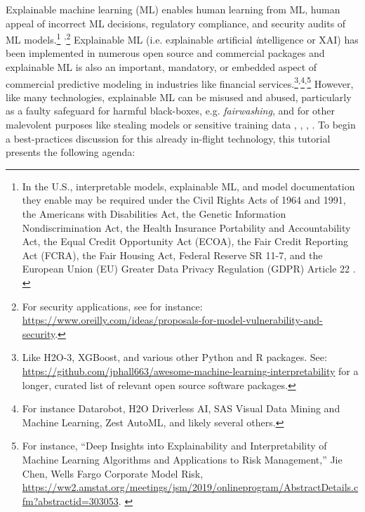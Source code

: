 \documentclass[sigconf]{acmart}
\begin{document}
Explainable machine learning (ML) enables human learning from ML, human appeal of incorrect ML decisions, regulatory compliance, and security audits of ML models.\footnote{In the U.S., interpretable models, explainable ML, and model documentation they enable may be required under the Civil Rights Acts of 1964 and 1991, the Americans with Disabilities Act, the Genetic Information Nondiscrimination Act, the Health Insurance Portability and Accountability Act, the Equal Credit Opportunity Act (ECOA), the Fair Credit Reporting Act (FCRA), the Fair Housing Act, Federal Reserve SR 11-7, and the European Union (EU) Greater Data Privacy Regulation (GDPR) Article 22 \cite{ff_interpretability}. \label{fn:regs}} \textsuperscript{,}\footnote{For security applications, see for instance: \url{https://www.oreilly.com/ideas/proposals-for-model-vulnerability-and-security}.\label{fn:regs}} Explainable ML (i.e. e\textit{x}plainable \textit{a}rtificial \textit{i}ntelligence or XAI) has been implemented in numerous open source and commercial packages and explainable ML is also an important, mandatory, or embedded aspect of commercial predictive modeling in industries like financial services.\footnote{Like H2O-3, XGBoost, and various other Python and R packages. See: \url{https://github.com/jphall663/awesome-machine-learning-interpretability} for a longer, curated list of relevant open source software packages.}\textsuperscript{,}\footnote{For instance  Datarobot, H2O Driverless AI, SAS Visual Data Mining and Machine Learning, Zest AutoML, and likely several others.}\textsuperscript{,}\footnote{For instance, ``Deep Insights into Explainability and Interpretability of Machine Learning Algorithms and Applications to Risk Management,'' Jie Chen, Wells Fargo Corporate Model Risk, \url{https://ww2.amstat.org/meetings/jsm/2019/onlineprogram/AbstractDetails.cfm?abstractid=303053}. \label{fn:Chen}} However, like many technologies, explainable ML can be misused and abused, particularly as a faulty safeguard for harmful black-boxes, e.g. \textit{fairwashing}, and for other malevolent purposes like stealing models or sensitive training data \cite{fair_washing}, \cite{please_stop}, \cite{membership_inference}, \cite{model_stealing}. To begin a best-practices discussion for this already in-flight technology, this tutorial presents the following agenda:\\
\end{document}

